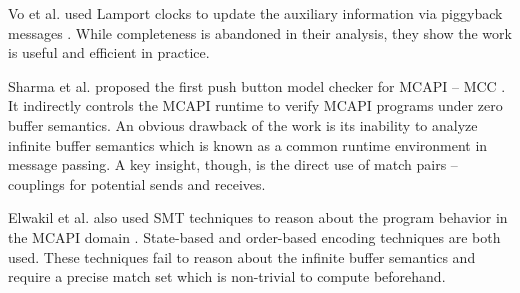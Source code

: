 Vo et al. used Lamport clocks to update the auxiliary information via piggyback messages \cite{DBLP:conf/sc/VoAGSSB10,DBLP:conf/IEEEpact/VoGKSSB11}. While completeness is abandoned in their analysis, they show the work is useful and efficient in practice. 

Sharma et al. proposed the first push button model checker for MCAPI -- MCC \cite{DBLP:conf/fmcad/SharmaGMH09}. It indirectly controls the MCAPI runtime to verify MCAPI programs under zero buffer semantics. An obvious drawback of the work is its inability to analyze infinite buffer semantics which is known as a common runtime environment in message passing. A key insight, though, is the direct use of match pairs -- couplings for potential sends and receives.

Elwakil et al. also used SMT techniques to reason about the program behavior in the MCAPI domain \cite{DBLP:conf/issta/ElwakilY10,DBLP:conf/atva/ElwakilYW10}. State-based and order-based encoding techniques are both used. These techniques fail to reason about the infinite buffer semantics and require a precise match set which is non-trivial to compute beforehand.

